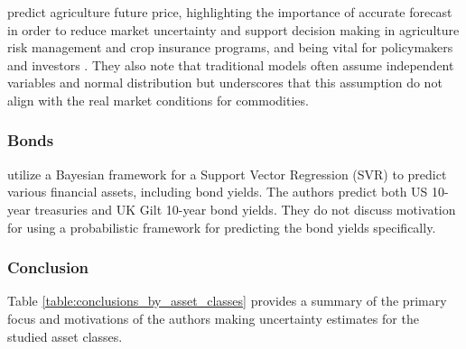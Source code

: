\textcite{li2020multivariate} predict agriculture future price, highlighting the importance of accurate forecast in order to reduce market uncertainty and support decision making in agriculture risk management and crop insurance programs, and being vital for policymakers and investors \parencite{li2020multivariate, Wang2017Performance, Ouyang2019Agricultural}. They also note that traditional models often assume independent variables and normal distribution but underscores that this assumption do not align with the real market conditions for commodities. 


\subsubsection{Bonds}
\textcite{Law2017Practical} utilize a Bayesian framework for a Support Vector Regression (SVR) to predict various financial assets, including bond yields. The authors predict both US 10-year treasuries and UK Gilt 10-year bond yields. They do not discuss motivation for using a probabilistic framework for predicting the bond yields specifically. 






\subsubsection{Conclusion} %
Table \ref{table:conclusions_by_asset_classes} provides a summary of the primary focus and motivations of the authors making uncertainty estimates for the studied asset classes.

